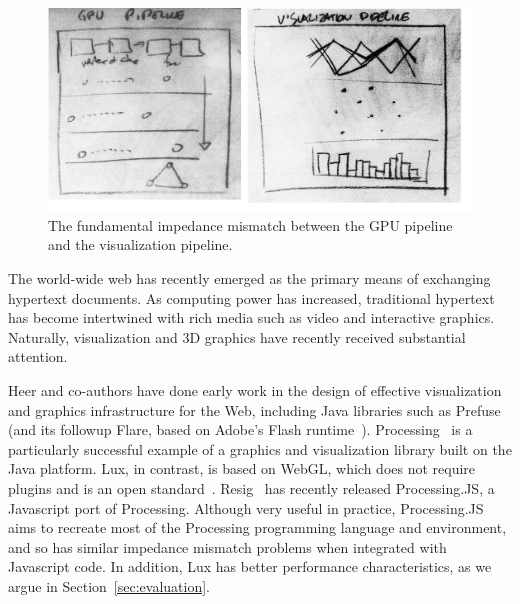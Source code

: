\begin{figure}
\includegraphics[width=\linewidth]{fig/pipeline_mismatch/pipeline_mismatch.jpg}
\caption{The fundamental impedance mismatch between the GPU pipeline and the visualization pipeline.\label{fig:mismatch}}
\end{figure}

The world-wide web has recently emerged as the primary means of exchanging hypertext documents. 
As computing power has increased, traditional hypertext has become intertwined with rich media such as video and interactive graphics. 
Naturally, visualization and 3D graphics have recently received substantial attention.

Heer and co-authors have done early work in the design of effective visualization and graphics infrastructure for the Web, including Java libraries such as Prefuse~\cite{Heer:2005:PAT} (and its followup Flare, based on Adobe's Flash runtime~\cite{Adobe:2011:Flash}).
Processing~\cite{Reas:2007:PAP} is a particularly successful example of a graphics and visualization library built on the Java platform.
Lux, in contrast, is based on WebGL, which does not require plugins and is an open standard~\cite{webgl-spec}.
Resig~\cite{Resig:2010:PJ} has recently released Processing.JS, a Javascript port of Processing.
Although very useful in practice, Processing.JS aims to recreate most of the Processing programming language and environment, and so has similar impedance mismatch problems when integrated with Javascript code.  In addition, Lux has better performance characteristics, as we argue in Section~\ref{sec:evaluation}.


